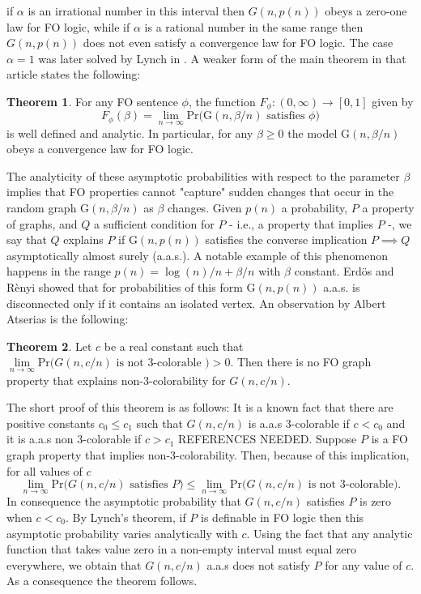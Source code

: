 \documentclass[12pt,notitlepage,a4paper]{article}
\theoremstyle{definition}
\newtheorem{theorem}{Theorem}[section]
\newcommand{\Ln}{\lim\limits_{n\to \infty}}
\begin{document}
if $\alpha$ is an irrational number in this interval then
$G(n,p(n))$ obeys a zero-one law for FO logic, while if $\alpha$
is a rational number in the same range then $G(n,p(n))$ does not
even satisfy a convergence law for FO logic. The case $\alpha=1$
was later solved by Lynch in \cite{lynch1992probabilities}. A weaker
form of the main theorem in that article states the following:
\begin{theorem} 
	For any FO sentence $\phi$, the function
	$F_\phi: (0,\infty)\rightarrow [0,1]$ given by 
	\[ F_\phi(\beta) = \Ln \mathrm{Pr}\big( \mathrm{G}(n,\beta/n)
	\text{ satisfies } \phi   \big) \]
	is well defined and analytic. In particular, for any
	$\beta \geq 0$ the model $\mathrm{G}(n,\beta/n)$
	obeys a convergence law for FO logic. 
\end{theorem}

The analyticity of these asymptotic probabilities with respect to 
the parameter $\beta$ implies that FO properties cannot "capture" sudden
changes that occur in the random graph $\mathrm{G}(n,\beta/n)$
as $\beta$ changes. Given $p(n)$ a probability, $P$ a property of graphs,
and $Q$ a sufficient condition for $P$ - i.e., a property that 
implies $P$ -, we say that $Q$ explains $P$ if $\mathrm{G}(n,p(n))$ satisfies 
the converse implication $P \implies Q$ asymptotically almost surely
(a.a.s.). A notable example of this phenomenon happens in the range 
$p(n)= \log(n)/n + \beta/n$ with $\beta$ constant. Erd\"os and R\`enyi
\cite{erdHos1960evolution} 
showed that for probabilities of this form $\mathrm{G}(n,p(n))$ 
a.a.s. is disconnected only if it contains an isolated vertex. 
An observation by Albert Atserias is the following:

\begin{theorem}
Let $c$ be a real constant such that 
$\Ln \mathrm{Pr}\big( G(n, c/n) 
\text{ is not }	3\text{-colorable }\big)> 0$.  
Then there is no FO graph property that explains 
non-$3$-colorability for $G(n, c/n)$.
\end{theorem}

The short proof of this theorem is as follows: 
It is a known fact that there are positive constants
$c_0\leq c_1$ such that $G(n, c/n)$ is a.a.s $3$-colorable
if $c<c_0$ and it is a.a.s non $3$-colorable if $c>c_1$ 
REFERENCES NEEDED.
Suppose $P$ is a FO graph property that implies
non-$3$-colorability. Then, because of this implication,
for all values of $c$
\[\Ln \mathrm{Pr}\big( G(n, c/n) 
\text{ satisfies } P \big) \leq \Ln \mathrm{Pr}\big( G(n, c/n) 
\text{ is not }	3\text{-colorable}\big).\]
In consequence the asymptotic probability that $G(n,c/n)$ 
satisfies $P$ is zero when $c<c_0$. By Lynch's theorem, if 
$P$ is definable in FO logic then this asymptotic probability
varies analytically with $c$. Using the fact that any analytic 
function that takes value zero in a non-empty interval must 
equal zero everywhere, we obtain that $G(n,c/n)$ a.a.s does 
not satisfy $P$ for any value of $c$. 
As a consequence the theorem follows.  \par
\end{document}
